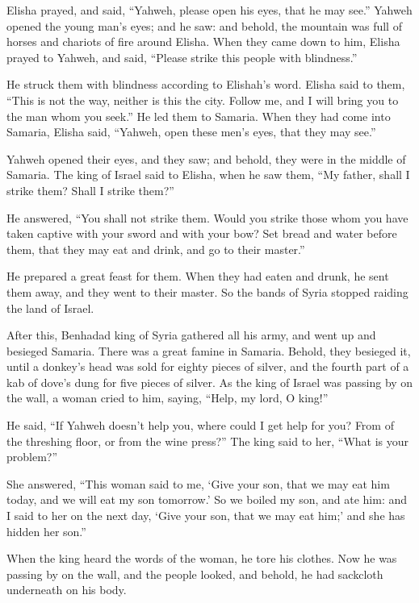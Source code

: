 {Elisha prayed, and said, “Yahweh, please open his eyes, that he may see.” Yahweh opened the young man’s eyes; and he saw: and behold, the mountain was full of horses and chariots of fire around Elisha.
When they came down to him, Elisha prayed to Yahweh, and said, “Please strike this people with blindness.”
\par }{\PP He struck them with blindness according to Elishah’s word.
Elisha said to them, “This is not the way, neither is this the city. Follow me, and I will bring you to the man whom you seek.” He led them to Samaria.
When they had come into Samaria, Elisha said, “Yahweh, open these men’s eyes, that they may see.”
\par }{\PP Yahweh opened their eyes, and they saw; and behold, they were in the middle of Samaria.
The king of Israel said to Elisha, when he saw them, “My father, shall I strike them? Shall I strike them?”
\par }{\PP {}He answered, “You shall not strike them. Would you strike those whom you have taken captive with your sword and with your bow? Set bread and water before them, that they may eat and drink, and go to their master.”
\par }{\PP {}He prepared a great feast for them. When they had eaten and drunk, he sent them away, and they went to their master. So the bands of Syria stopped raiding the land of Israel.
\par }{\PP {}After this, Benhadad king of Syria gathered all his army, and went up and besieged Samaria.
There was a great famine in Samaria. Behold, they besieged it, until a donkey’s head was sold for eighty pieces of silver, and the fourth part of a kab of dove’s dung for five pieces of silver.
As the king of Israel was passing by on the wall, a woman cried to him, saying, “Help, my lord, O king!”
\par }{\PP {}He said, “If Yahweh doesn’t help you, where could I get help for you? From of the threshing floor, or from the wine press?”
The king said to her, “What is your problem?”
\par }{\PP She answered, “This woman said to me, ‘Give your son, that we may eat him today, and we will eat my son tomorrow.’
So we boiled my son, and ate him: and I said to her on the next day, ‘Give your son, that we may eat him;’ and she has hidden her son.”
\par }{\PP {}When the king heard the words of the woman, he tore his clothes. Now he was passing by on the wall, and the people looked, and behold, he had sackcloth underneath on his body.
}
